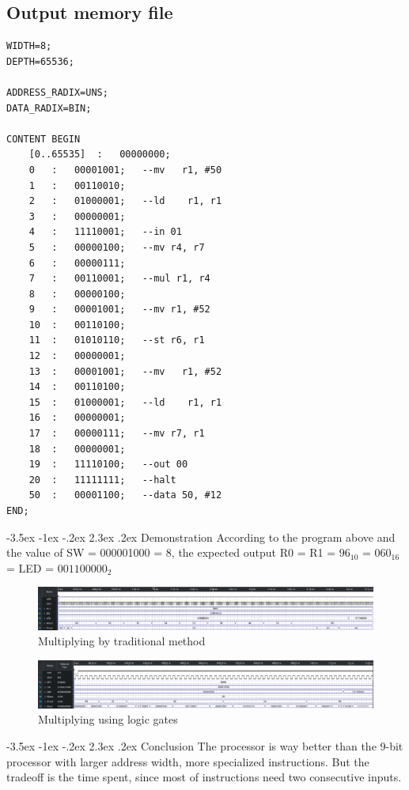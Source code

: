 \documentclass[13pt,a4paper]{report}
\makeatletter
\renewcommand\section{\@startsection {section}{1}{-1em}%
  {-3.5ex \@plus -1ex \@minus -.2ex}%
  {2.3ex \@plus.2ex}%
  {\normalfont\Large\bfseries}}
\makeatother
\begin{document}
\subsection*{Output memory file}
\begin{verbatim}
WIDTH=8;
DEPTH=65536;

ADDRESS_RADIX=UNS;
DATA_RADIX=BIN;

CONTENT BEGIN
	[0..65535]	:	00000000;
	0	:	00001001;	--mv   r1, #50
	1	:	00110010;
	2	:	01000001;	--ld    r1, r1
	3	:	00000001;
	4	:	11110001;	--in 01
	5	:	00000100;	--mv r4, r7
	6	:	00000111;
	7	:	00110001;	--mul r1, r4
	8	:	00000100;
	9	:	00001001;	--mv r1, #52
	10	:	00110100;
	11	:	01010110;	--st r6, r1
	12	:	00000001;
	13	:	00001001;	--mv   r1, #52
	14	:	00110100;
	15	:	01000001;	--ld    r1, r1
	16	:	00000001;
	17	:	00000111;	--mv r7, r1
	18	:	00000001;
	19	:	11110100;	--out 00
	20	:	11111111;	--halt
	50	:	00001100;	--data 50, #12
END;
\end{verbatim}

\section{Demonstration}
According to the program above and the value of SW = 000001000 = 8, the expected output R0 = R1 = $96_{10}$ = $060_{16}$ = LED = $001100000_2$

\begin{figure}[H]
\centering
\includegraphics[scale=0.275]{images/8bit_waveform.png}
\caption*{Multiplying by traditional method}
\end{figure}

\begin{figure}[H]
\centering
\includegraphics[scale=0.275]{images/8bit_waveform_2.png}
\caption*{Multiplying using logic gates}
\end{figure}

\section{Conclusion}
The processor is way better than the 9-bit processor with larger address width, more specialized instructions. But the tradeoff is the time spent, since most of instructions need two consecutive inputs.
\end{document}
